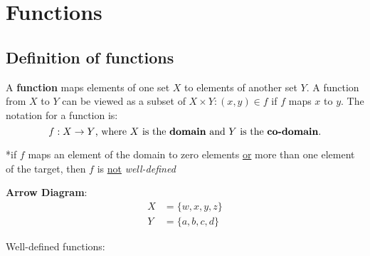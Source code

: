 \section{Functions}
\subsection{Definition of functions}

A \textbf{function} maps elements of one set $X$ to elements of another set $Y$.
A function from $X$ to $Y$ can be viewed as a subset of $X \times Y : (x, y) \in f$ if $f$ maps $x$ to $y$.
The notation for a function is:
\[
  f: X \rightarrow Y \text{, where $X$ is the \textbf{domain} and $Y$ is the \textbf{co-domain}.}
\]

*if $f$ maps an element of the domain to zero elements \underline{or} more than one element of the target,
then $f$ is \underline{not} \textit{well-defined}

\textbf{Arrow Diagram}:
\begin{align*}
  X & = \{w, x, y, z\} \\
  Y & = \{a, b, c, d\}
\end{align*}

Well-defined functions:
\begin{center}
  \qquad
\end{center}

